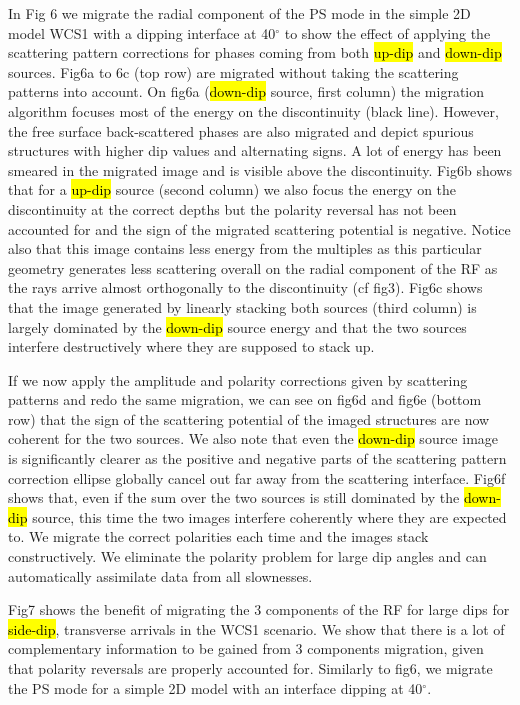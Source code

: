 \documentclass[10pt,a4paper]{article}
\numberwithin{equation}{section}
\begin{document}
In Fig 6 we migrate the radial component of the PS mode in the simple 2D model WCS1 with a dipping interface at 40$^{\circ}$ to show the effect of applying the scattering pattern corrections for phases coming from both \hl{up-dip} and \hl{down-dip} sources.
Fig6a to 6c (top row) are migrated without taking the scattering patterns into account.
On fig6a (\hl{down-dip} source, first column) the migration algorithm focuses most of the energy on the discontinuity (black line).
However, the free surface back-scattered phases are also migrated and depict spurious structures with higher dip values and alternating signs.
A lot of energy has been smeared in the migrated image and is visible above the discontinuity.
Fig6b shows that for a \hl{up-dip} source (second column) we also focus the energy on the discontinuity at the correct depths but the polarity reversal has not been accounted for and the sign of the migrated scattering potential is negative.
Notice also that this image contains less energy from the multiples as this particular geometry generates less scattering overall on the radial component of the RF as the rays arrive almost orthogonally to the discontinuity (cf fig3).
Fig6c shows that the image generated by linearly stacking both sources (third column) is largely dominated by the \hl{down-dip} source energy and that the two sources interfere destructively where they are supposed to stack up.

If we now apply the amplitude and polarity corrections given by scattering patterns and redo the same migration, we can see on fig6d and fig6e (bottom row) that the sign of the scattering potential of the imaged structures are now coherent for the two sources.
We also note that even the \hl{down-dip} source image is significantly clearer as the positive and negative parts of the scattering pattern correction ellipse globally cancel out far away from the scattering interface.
Fig6f shows that, even if the sum over the two sources is still dominated by the \hl{down-dip} source, this time the two images interfere coherently where they are expected to.
We migrate the correct polarities each time and the images stack constructively.
We eliminate the polarity problem for large dip angles and can automatically assimilate data from all slownesses.

Fig7 shows the benefit of migrating the 3 components of the RF for large dips for \hl{side-dip}, transverse arrivals in the WCS1 scenario.
We show that there is a lot of complementary information to be gained from 3 components migration, given that polarity reversals are properly accounted for.
Similarly to fig6, we migrate the PS mode for a simple 2D model with an interface dipping at 40$^{\circ}$.
\end{document}
